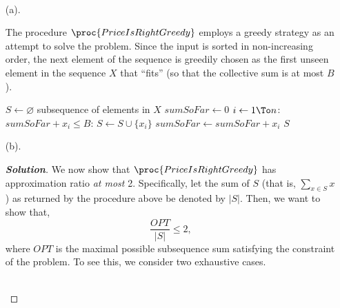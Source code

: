 \documentclass[a4paper,twoside,10pt]{report}
\newcommand{\marginline}{\noindent\makebox[\linewidth][r]{\rule{\textwidth}{1pt}}}
\newcommand{\exer}[1]{\noindent{\Large\textsc{Question #1}} \\ \marginline}
\newenvironment{soln}{\begin{proof}[\textit{\textbf{Solution}}]}{\\ \end{proof}}
\newenvironment{exercise}[1]{\exer{#1}}{}
\begin{document}
\begin{exercise}{4}

\begin{enumerate}
\item[(a).]

The procedure $\proc{PriceIsRightGreedy}$ employs a greedy strategy as an attempt to solve the problem. Since the input is sorted in non-increasing order, the next element of the sequence is greedily chosen as the first unseen element in the sequence $X$ that ``fits'' (so that the collective sum is at most $B$).

\begin{codebox}
\li $S \gets \varnothing$ \Comment subsequence of elements in $X$ 
\li $sumSoFar \gets 0$
\li \For $i \gets 1 \To n$: \Do
\li     \If $sumSoFar + x_i \leq B$: \Then
\li         $S \gets S \cup \{x_i\}$
\li         $sumSoFar \gets sumSoFar + x_i$
        \End
    \End
\li \Return $S$

\end{codebox}


\item[(b).]
\begin{soln}
We now show that $\proc{PriceIsRightGreedy}$ has approximation ratio \emph{at most} 2. Specifically, let the sum of $S$ (that is, $\displaystyle \sum\limits_{x \in S} x$) as returned by the procedure above be denoted by $\lvert S\rvert$. Then, we want to show that,
\[\displaystyle \frac{OPT}{\lvert S \rvert} \leq 2, \]
where $OPT$ is the maximal possible subsequence sum satisfying the constraint of the problem. To see this, we consider two exhaustive cases.


\end{soln}
\end{enumerate}
\end{exercise}
\end{document}
